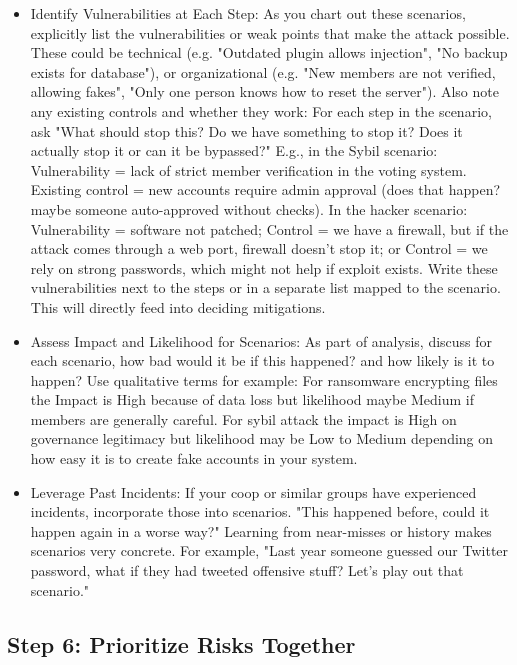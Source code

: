 \begin{itemize}
    \item Identify Vulnerabilities at Each Step: As you chart out these scenarios, explicitly list the
    vulnerabilities or weak points that make the attack possible. These could be technical (e.g.
    "Outdated plugin allows injection", "No backup exists for database"), or organizational (e.g. "New
    members are not verified, allowing fakes", "Only one person knows how to reset the server"). Also
    note any existing controls and whether they work: For each step in the scenario, ask "What should
    stop this? Do we have something to stop it? Does it actually stop it or can it be bypassed?"
    E.g., in the Sybil scenario: Vulnerability = lack of strict member verification in the
    voting system. Existing control = new accounts require admin approval (does that happen? maybe
    someone auto-approved without checks).
    In the hacker scenario: Vulnerability = software not patched; Control = we have a
    firewall, but if the attack comes through a web port, firewall doesn't stop it; or Control = we rely
    on strong passwords, which might not help if exploit exists.
    Write these vulnerabilities next to the steps or in a separate list mapped to the
    scenario. This will directly feed into deciding mitigations.

    \item Assess Impact and Likelihood for Scenarios: As part of analysis, discuss for each scenario,
    how bad would it be if this happened? and how likely is it to happen? Use qualitative terms for example:
    For ransomware encrypting files the Impact is High because of data loss but likelihood maybe Medium
    if members are generally careful. For sybil attack the impact is High on governance
    legitimacy but likelihood may be Low to Medium depending on how easy it is to create fake accounts in your
    system.

    \item Leverage Past Incidents: If your coop or similar groups have experienced incidents,
    incorporate those into scenarios. "This happened before, could it happen again in a worse way?"
    Learning from near-misses or history makes scenarios very concrete. For example, "Last year someone
    guessed our Twitter password, what if they had tweeted offensive stuff? Let's play out that
    scenario."
\end{itemize}

\subsection{Step 6: Prioritize Risks Together}
\label{subsec:Step6}


